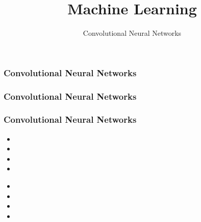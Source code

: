 \documentclass{formation}
\title{Machine Learning}
\subtitle{Convolutional Neural Networks}
\begin{document}
\maketitle

\begin{frame}
  \frametitle{Convolutional Neural Networks}
\end{frame}

\begin{frame}
  \frametitle{Convolutional Neural Networks}
\end{frame}

\begin{frame}
  \frametitle{Convolutional Neural Networks}

  
  \begin{itemize}
  \item 
  \item 
  \item 
  \item 
  \end{itemize}

  \begin{minipage}[l]{0.49\linewidth}
  \end{minipage}\hfill
  \begin{minipage}[l]{0.49\linewidth}
  \end{minipage}\hfill

  \begin{minipage}[l]{0.49\linewidth}
      \begin{itemize}
      \item 
      \item 
      \item 
      \item 
      \end{itemize}
  \end{minipage}\hfill
  \begin{minipage}[l]{0.49\linewidth}
  \end{minipage}\hfill

\end{frame}
\end{document}

